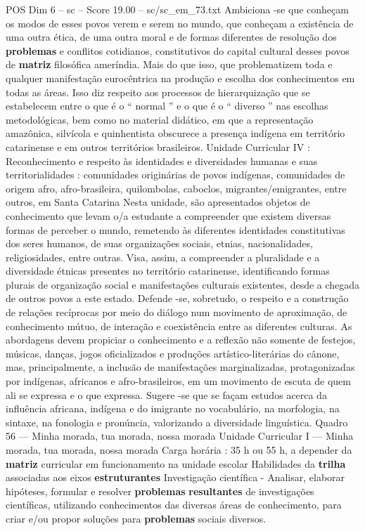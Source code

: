 \begin{textsample}{POS Dim 6 – sc – Score 19.00 – sc/sc\_em\_73.txt}
Ambiciona -se que conheçam os modos de esses povos verem e serem no mundo, que conheçam a existência de uma outra ética, de uma outra moral e de formas diferentes de resolução dos \textbf{problemas} e conflitos cotidianos, constitutivos do capital cultural desses povos de \textbf{matriz} filosófica ameríndia.
Mais do que isso, que problematizem toda e qualquer manifestação eurocêntrica na produção e escolha dos conhecimentos em todas as áreas.
Isso diz respeito aos processos de hierarquização que se estabelecem entre o que é o “ normal ” e o que é o “ diverso ” nas escolhas metodológicas, bem como no material didático, em que a representação amazônica, silvícola e quinhentista obscurece a presença indígena em território catarinense e em outros territórios brasileiros.
Unidade Curricular IV : Reconhecimento e respeito às identidades e diversidades humanas e suas territorialidades : comunidades originárias de povos indígenas, comunidades de origem afro, afro-brasileira, quilombolas, caboclos, migrantes/emigrantes, entre outros, em Santa Catarina Nesta unidade, são apresentados objetos de conhecimento que levam o/a estudante a compreender que existem diversas formas de perceber o mundo, remetendo às diferentes identidades constitutivas dos seres humanos, de suas organizações sociais, etnias, nacionalidades, religiosidades, entre outras.
Visa, assim, a compreender a pluralidade e a diversidade étnicas presentes no território catarinense, identificando formas plurais de organização social e manifestações culturais existentes, desde a chegada de outros povos a este estado.
Defende -se, sobretudo, o respeito e a construção de relações recíprocas por meio do diálogo num movimento de aproximação, de conhecimento mútuo, de interação e coexistência entre as diferentes culturas.
As abordagens devem propiciar o conhecimento e a reflexão não somente de festejos, músicas, danças, jogos oficializados e produções artístico-literárias do cânone, mas, principalmente, a inclusão de manifestações marginalizadas, protagonizadas por indígenas, africanos e afro-brasileiros, em um movimento de escuta de quem ali se expressa e o que expressa.
Sugere -se que se façam estudos acerca da influência africana, indígena e do imigrante no vocabulário, na morfologia, na sintaxe, na fonologia e pronúncia, valorizando a diversidade linguística.
Quadro 56 — Minha morada, tua morada, nossa morada Unidade Curricular I — Minha morada, tua morada, nossa morada Carga horária : 35 h ou 55 h, a depender da \textbf{matriz} curricular em funcionamento na unidade escolar Habilidades da \textbf{trilha} associadas aos eixos \textbf{estruturantes} Investigação científica - Analisar, elaborar hipóteses, formular e resolver \textbf{problemas} \textbf{resultantes} de investigações científicas, utilizando conhecimentos das diversas áreas de conhecimento, para criar e/ou propor soluções para \textbf{problemas} sociais diversos.

\end{textsample}
